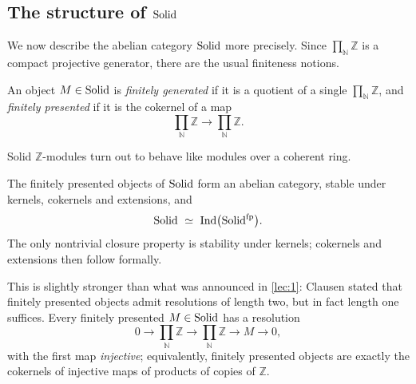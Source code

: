 \subsection{The structure of \texorpdfstring{$\mathrm{Solid}$}{Solid}}

We now describe the abelian category $\mathrm{Solid}$ more precisely. Since
$\prod_{\mathbb{N}}\mathbb{Z}$ is a compact projective generator, there are the
usual finiteness notions.

\begin{definition}
\label{def:6:fg-fp}
An object $M\in\mathrm{Solid}$ is \emph{finitely generated} if it is a quotient of a
single $\prod_{\mathbb{N}}\mathbb{Z}$, and \emph{finitely presented} if it is the
cokernel of a map
\begin{equation}
\label{eq:6:fp}
\prod_{\mathbb{N}}\mathbb{Z}\longrightarrow\prod_{\mathbb{N}}\mathbb{Z}.
\end{equation}
\end{definition}

Solid $\mathbb{Z}$-modules turn out to behave like modules over a coherent ring.

\begin{theorem}
\label{thm:6:fp-abelian}
The finitely presented objects of $\mathrm{Solid}$ form an abelian category, stable under
kernels, cokernels and extensions, and
\begin{equation*}
\Solid\ \simeq\ \mathrm{Ind}\bigl(\Solid^{\mathrm{fp}}\bigr).
\end{equation*}
The only nontrivial closure property is stability under kernels; cokernels and
extensions then follow formally.
\end{theorem}

\begin{remark}
\label{rmk:6:length-one}
This is slightly stronger than what was announced in \cref{lec:1}: Clausen stated
that finitely presented objects admit resolutions of length two, but in fact
length one suffices. Every finitely presented $M\in\mathrm{Solid}$ has a resolution
\begin{equation}
\label{eq:6:fp-resolution}
0\longrightarrow\prod_{\mathbb{N}}\mathbb{Z}\longrightarrow\prod_{\mathbb{N}}\mathbb{Z}
\longrightarrow M\longrightarrow0,
\end{equation}
with the first map \emph{injective}; equivalently, finitely presented objects are
exactly the cokernels of injective maps of products of copies of $\mathbb{Z}$.
\end{remark}

